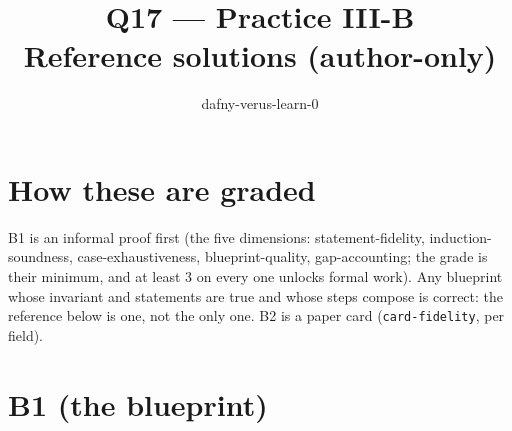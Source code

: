 \documentclass[11pt]{article}
\title{Q17 --- Practice III-B \\ \large Reference solutions (author-only)}
\author{dafny-verus-learn-0}
\date{}
\begin{document}
\maketitle
\sloppy

\section*{How these are graded}
B1 is an informal proof first (the five dimensions: statement-fidelity,
induction-soundness, case-exhaustiveness, blueprint-quality, gap-accounting;
the grade is their minimum, and at least 3 on every one unlocks formal work).
Any blueprint whose invariant and statements are true and whose steps compose
is correct: the reference below is one, not the only one. B2 is a paper card
(\texttt{card-fidelity}, per field).

\section*{B1 (the blueprint)}
\end{document}
